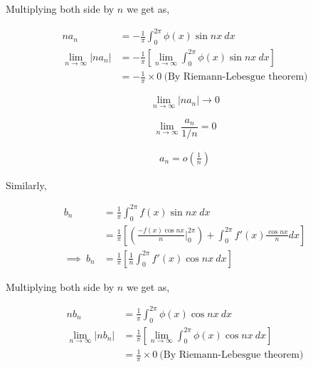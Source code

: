 \documentclass[a4paper,12pt]{article}
\begin{document}
        Multiplying both side by $n$ we get as,

        \begin{center}
            \begin{equation*}
                \begin{split}
                    na_{n} & = - \frac{1}{\pi}\int_{0}^{2\pi}\phi(x)\sin nx \ dx\\[2.5mm]
                    \lim_{n\to \infty}\left|na_{n}\right| & = - \frac{1}{\pi}\left[\lim_{n\to \infty}\int_{0}^{2\pi}\phi(x)\sin nx \ dx\right]\\[2.5mm]
                    & = - \frac{1}{\pi}\times 0\ \mbox{(By Riemann-Lebesgue theorem)}
                \end{split}
            \end{equation*}
        \end{center}

        $$\lim_{n\to \infty}\left|na_{n}\right|  \to 0$$

        $$\lim_{n\to \infty}\frac{a_{n}}{1/n}  = 0$$

        \begin{align*}
            \boxed{a_{n} = o\left(\frac{1}{n}\right)}
        \end{align*}

        Similarly,

        \begin{center}
            \begin{equation*}
                \begin{split}
                    b_{n} & = \frac{1}{\pi}\int_{0}^{2\pi}f(x)\sin nx \ dx\\[2.5mm]
                    & = \frac{1}{\pi}\left[\left(\frac{-f(x)\cos nx}{n}\bigg|_{0}^{2\pi}\right) + \int_{0}^{2\pi}f'(x)\frac{\cos nx}{n}dx\right]\\[2.5mm]
                    \implies\ b_{n} & = \frac{1}{\pi}\left[\frac{1}{n}\int_{0}^{2\pi}f'(x)\cos nx \ dx\right]
                \end{split}
            \end{equation*}
        \end{center}

        Multiplying both side by $n$ we get as,

        \begin{center}
            \begin{equation*}
                \begin{split}
                    nb_{n} & =  \frac{1}{\pi}\int_{0}^{2\pi}\phi(x)\cos nx \ dx\\[2.5mm]
                    \lim_{n\to \infty}\left|nb_{n}\right| & =  \frac{1}{\pi}\left[\lim_{n\to \infty}\int_{0}^{2\pi}\phi(x)\cos nx \ dx\right]\\[2.5mm]
                    & =  \frac{1}{\pi}\times 0\ \mbox{(By Riemann-Lebesgue theorem)}
                \end{split}
            \end{equation*}
        \end{center}
\end{document}
